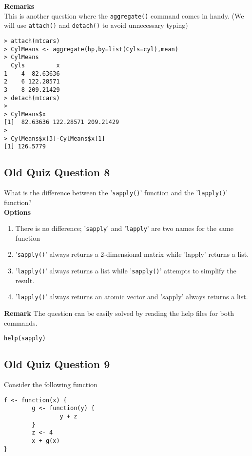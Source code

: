 \documentclass[]{article}
\begin{document}
\bigskip
\noindent \textbf{Remarks}\\
This is another question where the \texttt{aggregate()} command comes in handy. (We will use \texttt{attach()} and \texttt{detach()} to avoid unnecessary typing)
\begin{verbatim}
> attach(mtcars)
> CylMeans <- aggregate(hp,by=list(Cyls=cyl),mean)
> CylMeans 
  Cyls         x
1    4  82.63636
2    6 122.28571
3    8 209.21429
> detach(mtcars)
>
> CylMeans$x
[1]  82.63636 122.28571 209.21429
>
> CylMeans$x[3]-CylMeans$x[1]
[1] 126.5779
\end{verbatim}


\newpage
\subsection*{Old Quiz Question 8}
What is the difference between the '\texttt{sapply()}' function and the '\texttt{lapply()}' function?\\

\bigskip
\noindent \textbf{Options}
\begin{enumerate}
\item There is no difference; '\texttt{sapply}' and '\texttt{lapply}' are two names for the same function
\item '\texttt{sapply()}' always returns a 2-dimensional matrix while 'lapply' returns a list.
\item '\texttt{lapply()}' always returns a list while '\texttt{sapply()}' attempts to simplify the result. %
\item '\texttt{lapply()}' always returns an atomic vector and 'sapply' always returns a list.
\end{enumerate}

\bigskip
\noindent \textbf{Remark}
\noindent The question can be easily solved by reading the help files for both commands.
\begin{verbatim}
help(sapply)
\end{verbatim}
\newpage
\subsection*{Old Quiz Question 9}
Consider the following function
\begin{verbatim}
f <- function(x) {
        g <- function(y) {
                y + z
        }
        z <- 4
        x + g(x)
}
\end{verbatim}
\end{document}
